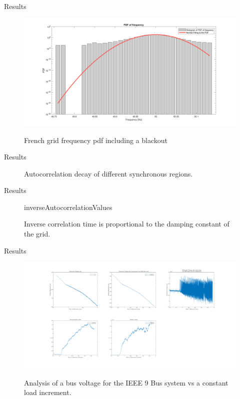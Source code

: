 \begin{frame}{Results}
	\begin{figure}
		\centering
		\includegraphics[scale=0.15]{../figures/pdf/pdf_frequency_rte_2021_01_blackout}
		\label{fig:pdf_rte2021blackout}
		\caption{French grid frequency pdf including a blackout}
	\end{figure}
\end{frame}

\begin{frame}{Results}	
	\begin{figure}[ht]
		\centering
		\caption{Autocorrelation decay of different synchronous regions.}
		\label{fig:comp5}
	\end{figure}
\end{frame}

\begin{frame}{Results}
	\begin{figure}
		\centering
		{inverseAutocorrelationValues}
		\label{tab:invAutocorr}
		\caption{Inverse correlation time is proportional to the damping constant of the grid.}
	\end{figure}	
\end{frame}

\begin{frame}{Results}
	\begin{figure}
		\centering
		\includegraphics[scale=0.20]{../figures/pdf/_ieee9busVoltages_9_T_3_sec.pdf}
		\label{fig:pdf_9bussystem}
		\caption{Analysis of a bus voltage for the IEEE 9 Bus system vs a constant load increment.}
	\end{figure}
\end{frame}

